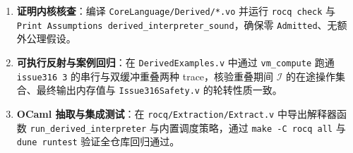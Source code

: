 \documentclass[UTF8,a4paper,11pt,fontset=fandol]{ctexart}
\newcommand{\code}[1]{\texttt{#1}}
\begin{document}
\begin{enumerate}
\item \textbf{证明内核核查}：编译 \code{CoreLanguage/Derived/*.vo} 并运行 \code{rocq check} 与 \code{Print Assumptions derived\_interpreter\_sound}，确保零 \code{Admitted}、无额外公理假设。
\item \textbf{可执行反射与案例回归}：在 \code{DerivedExamples.v} 中通过 \code{vm\_compute} 跑通 \code{issue316 3} 的串行与双缓冲重叠两种 trace，核验重叠期间 $\mathcal I$ 的在途操作集合、最终输出内存值与 \code{Issue316Safety.v} 的轮转性质一致。
\item \textbf{OCaml 抽取与集成测试}：在 \code{rocq/Extraction/\allowbreak Extract.v} 中导出解释器函数 \code{run\_derived\_interpreter} 与内置调度策略，通过 \code{make -C rocq all} 与 \code{dune runtest} 验证全仓库回归通过。
\end{enumerate}
\end{document}
